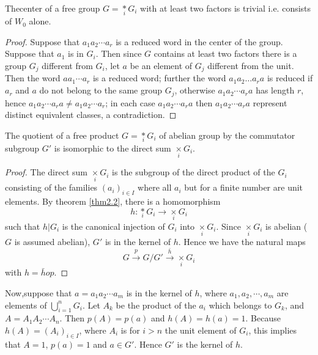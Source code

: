 \begin{theorem}\label{thm2.4} %
The\pageoriginale center of a free group $G=\underset{i}{\ast} G_i$
 with at least two factors is trivial i.e. consists of $W_0$ alone. 
\end{theorem}

\begin{proof}
Suppose that $a_1a_2 \cdots a_r$ is a reduced word in the center of
the group. Suppose that $a_1$ is in $G_i$. Then since $G$ contains at
least two factors there is a group $G_j$ different from $G_i$, let $a$
be an element of $G_j$ different from the unit. Then the word $aa_1
\cdots a_r$ is a reduced word; further the word $a_1 a_2 \ldots a_r a$
is reduced if $a_r$ and $a$ do not belong to the same
group $G_j$, otherwise $a_1a_2 \cdots a_r a$ has length $r$, hence
$a_1a_2 \cdots a_r a \neq a_1a_2 \cdots a_r$; in each case $a_1a_2
\cdots a_r a$ then $a_1a_2 \cdots a_r a$ represent distinct equivalent
classes, a contradiction. 
\end{proof}

\begin{theorem}\label{thm2.5}%
The quotient of a free product $G=\underset{i}* G_i$ of abelian
  group by the commutator subgroup $G'$ is isomorphic to the direct
  sum $\underset{i}\times  G_i$. 
\end{theorem}

\begin{proof}
The direct sum $\underset{i}\times G_i$ is the subgroup of the direct
product of the $G_i$ consisting of the families $(a_i)_{i\in I}$ where
all $a_i$ but for a finite number are unit elements. By theorem \ref{thm2.2},
there is a homomorphism  
$$
h:\underset{i}\ast G_i \to \underset{i}\times G_i
$$
such that $h|G_i$ is the canonical injection of $G_i$ into
$\underset{i}\times G_i$. Since $\underset{i}\times G_i$ is abelian ($G$ is
assumed abelian), $G'$ is in the kernel of $h$. Hence we have the
natural maps 
$$
G \xrightarrow{p} G/G' \xrightarrow{\bar{h}} \underset{i}\times G_i 
$$
with $h=\bar{h} op$.
\end{proof}

Now,\pageoriginale suppose that $a=a_1a_2 \cdots a_m$ is in the kernel
of $h$, where 
$a_1, a_2, \cdots, a_m $ are elements of $\bigcup\limits_{i=1}^n
G_i$. Let $A_k$ be the product of the $a_i$ which belongs to $G_k$,
and $A=A_1A_2 \cdots A_n$. Then $p(A)= p(a)$ and $h(A) = h(a) =
1$. Because $h(A) = (A_i)_{i \in I}$, where $A_i$ is 
for $i> n$ the unit element of $G_i$, this implies that $A=1$,
$p(a)= 1$ and $a \in G'$. Hence $G'$ is the kernel of $h$. 

